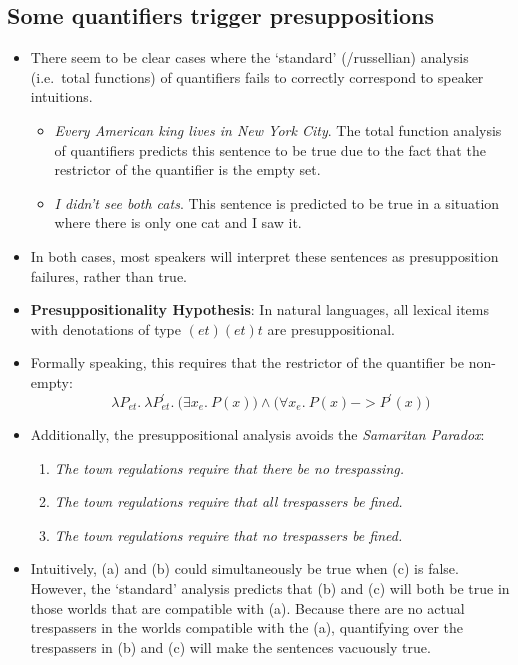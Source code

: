 \documentclass[a4paper]{article}
\begin{document}
\subsection{Some quantifiers trigger presuppositions}

\begin{itemize}
  \item There seem to be clear cases where the `standard' (/russellian) analysis (i.e.\ total functions) of quantifiers fails to correctly correspond to speaker intuitions.
  \begin{itemize}
    \item \emph{Every American king lives in New York City}. The total function analysis of quantifiers predicts this sentence to be true due to the fact that the restrictor of the quantifier is the empty set.
    \item \emph{I didn't see both cats}. This sentence is predicted to be true in a situation where there is only one cat and I saw it.
  \end{itemize}
  
  \item In both cases, most speakers will interpret these sentences as presupposition failures, rather than true.
  \item \textbf{Presuppositionality Hypothesis}: In natural languages, all lexical items with denotations of type $(et)(et)t$ are presuppositional.
  \item Formally speaking, this requires that the restrictor of the quantifier be non-empty:
    $$\lambda P_{et}.\ \lambda P^\prime_{et}.\ \Big(\exists x_e.\ P(x)\Big) \land \Big(\forall x_e.\ P(x) -> P^\prime(x)\Big)$$
  \item Additionally, the presuppositional analysis avoids the \emph{Samaritan Paradox}:
  
  \begin{enumerate}
    \item \emph{The town regulations require that there be no trespassing.}
    \item \emph{The town regulations require that all trespassers be fined.}
    \item \emph{The town regulations require that no trespassers be fined.}
  \end{enumerate}
  
  \item Intuitively, (a) and (b) could simultaneously be true when (c) is false. However, the `standard' analysis predicts that (b) and (c) will both be true in those worlds that are compatible with (a). Because there are no actual trespassers in the worlds compatible with the (a), quantifying over the trespassers in (b) and (c) will make the sentences vacuously true.
\end{itemize}
\end{document}
